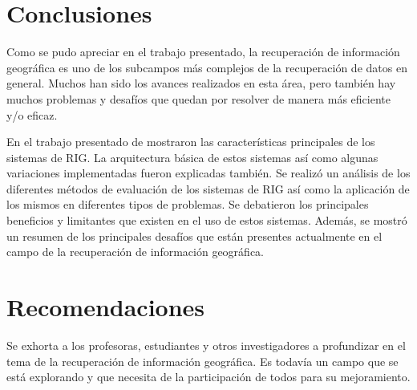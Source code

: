 \section{Conclusiones}\label{sec:conclusions}

Como se pudo apreciar en el trabajo presentado, la recuperación de información
geográfica es uno de los subcampos más complejos de la recuperación de datos
en general. Muchos han sido los avances realizados en esta área, pero también
hay muchos problemas y desafíos que quedan por resolver de manera más eficiente
y/o eficaz.

En el trabajo presentado de mostraron las características principales de los
sistemas de RIG. La arquitectura básica de estos sistemas así como algunas
variaciones implementadas fueron explicadas también. Se realizó un análisis de
los diferentes métodos de evaluación de los sistemas de RIG así como la
aplicación de los mismos en diferentes tipos de problemas. Se debatieron los
principales beneficios y limitantes que existen en el uso de estos sistemas.
Además, se mostró un resumen de los principales desafíos que están presentes
actualmente en el campo de la recuperación de información geográfica.


\section{Recomendaciones}\label{sec:recomend}

Se exhorta a los profesoras, estudiantes y otros investigadores a profundizar
en el tema de la recuperación de información geográfica. Es todavía un
campo que se está explorando y que necesita de la participación de todos
para su mejoramiento.

\newpage
